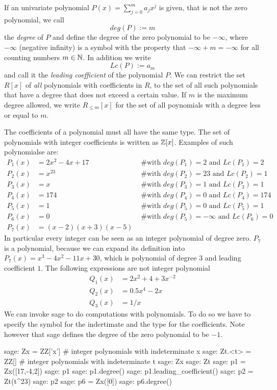 If an univariate polynomial $P(x)=\sum_{j=0}^m a_jx^j$ is given, that is not the zero polynomial, we call 
\begin{equation}
deg(P):=m
\end{equation}
the \textit{degree} of $P$ and define the degree of the zero polynomial to be $-\infty$, where $-\infty$ (negative infinity) is a symbol with the property that $-\infty + m = -\infty$ for all counting numbers $m\in\mathbb{N}$. In addition we write 
\begin{equation}
\label{def_leading_coefficient}
Lc(P):=a_m
\end{equation}
and call it the \textit{leading coefficient} of the polynomial $P$. We can restrict the set $R[x]$ of \textit{all} polynomials with coefficients in $R$, to the set of all such polynomials that have a degree that does not exceed a certain value. If $m$ is the maximum degree allowed, we write $R_{\leq m}[x]$ for the set of all poynomials with a degree less or equal to $m$.
\begin{example} The coefficients of a polynomial must all have the same type. The set of polynomials with integer coefficients is written as $\mathbb{Z}[x]$. Examples of such polynomialse are:
\begin{align*}
P_1(x) &= 2x^2 -4x +17 & \text{ \# with } deg(P_1)=2 \text{ and } Lc(P_1)=2\\
P_2(x) &= x^{23} & \text{ \# with } deg(P_2)=23 \text{ and } Lc(P_2)=1\\
P_3(x) &= x & \text{ \# with }  deg(P_3)=1 \text{ and } Lc(P_3)=1\\
P_4(x) &= 174 & \text{ \# with }  deg(P_4)=0 \text{ and } Lc(P_4)=174\\
P_5(x) &= 1 & \text{ \# with }  deg(P_5)=0 \text{ and } Lc(P_5)=1\\
P_6(x) &= 0 & \text{ \# with }  deg(P_5)=-\infty \text{ and } Lc(P_6)=0\\
P_7(x) &= (x-2)(x+3)(x-5)
\end{align*}
In particular every integer can be seen as an integer polynomial of degree zero. $P_7$ is a polynomial, because we can expand its definition into $P_7(x)=x^3 - 4 x^2 - 11 x + 30$, which is polynomial of degree $3$ and leading coefficient $1$. The following expressions are not integer polynomial
\begin{align*}
Q_1(x) &= 2x^2 + 4 + 3x^{-2}\\
Q_2(x) &= 0.5x^4 -2x\\
Q_3(x) &=1/x
\end{align*}
We can invoke sage to do computations with polynomials. To do so we have to specify the symbol for the indertimate and the type for the coefficients. Note however that sage defines the degree of the zero polynomial to be $-1$.
\begin{sagecommandline}
sage: Zx = ZZ['x'] # integer polynomials with indeterminate x
sage: Zt.<t> = ZZ[] # integer polynomials with indeterminate t
sage: Zx
sage: Zt
sage: p1 = Zx([17,-4,2])
sage: p1
sage: p1.degree()
sage: p1.leading_coefficient()
sage: p2 = Zt(t^23)
sage: p2
sage: p6 = Zx([0])
sage: p6.degree()
\end{sagecommandline}
\end{example}
